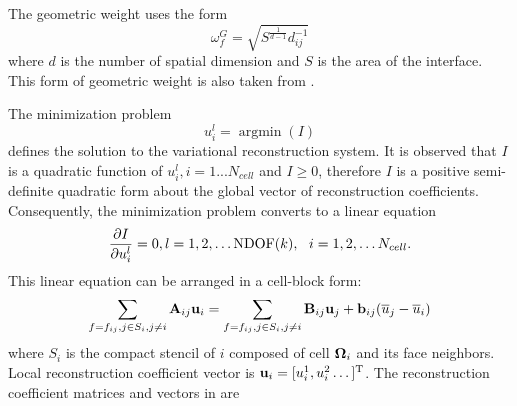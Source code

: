The geometric weight uses the form
\begin{equation}
    \omega_f^G = \sqrt{S^{\frac{1}{d-1}}d_{ij}^{-1}}
\end{equation}
where $d$ is the number of spatial dimension and $S$ is the area of the interface.
This form of
geometric weight is also taken from \cite{huang2022high}.

The minimization problem
\begin{equation}
    u_i^l = \mathop{\arg \min}(I)
\end{equation}
defines the solution to the variational reconstruction system.
It is observed that $I$ is a quadratic function of $u_i^l, i = 1...N_{cell}$ and
$I\geq 0$,
therefore $I$ is a positive semi-definite quadratic form about the global vector of reconstruction
coefficients. Consequently, the minimization problem converts to a linear equation
\begin{equation}
    \partialderivative{I}{u_i^l} = 0, l=1,2,\dots \mathrm{NDOF}(k),\ \ i=1,2,\dots N_{cell} .
\end{equation}
This linear equation can be arranged in a cell-block form:
\begin{equation}
    \label{eq:vrBlockEq}
    \sum_{f=f_{ij},j\in S_i, j\neq i}{ \mathbf{A}_{ij} \mathbf{u}_i}
    =
    \sum_{f=f_{ij},j\in S_i, j\neq i}{ \mathbf{B}_{ij} \mathbf{u}_j + \mathbf{b}_{ij} (\overline{u}_j - \overline{u}_i)}
\end{equation}
where $S_i$ is the compact stencil of $i$ composed of cell $\mathbf{\Omega}_{i}$ and its face neighbors.
Local reconstruction coefficient vector is $\mathbf{u}_i = [u_i^1,u_i^2\dots]^\mathrm{T}$.
The reconstruction coefficient matrices and vectors in 
are
